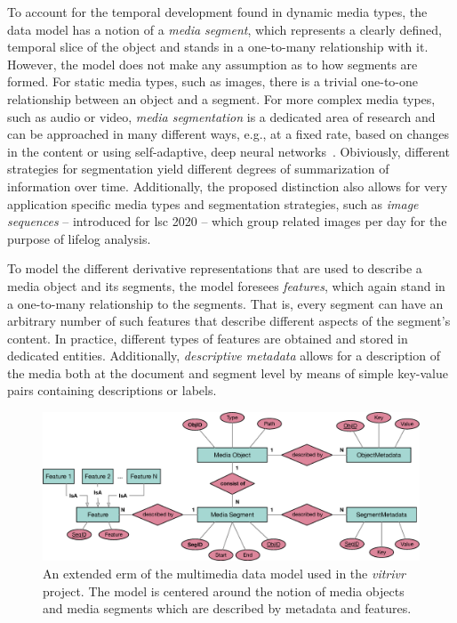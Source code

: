 To account for the temporal development found in dynamic media types, the data model has a notion of a \emph{media segment}, which represents a clearly defined, temporal slice of the object and stands in a one-to-many relationship with it. However, the model does not make any assumption as to how segments are formed. For static media types, such as images, there is a trivial one-to-one relationship between an object and a segment. For more complex media types, such as audio or video, \emph{media segmentation} is a dedicated area of research \cite{Koprinska:2001temporal} and can be approached in many different ways, e.g., at a fixed rate, based on changes in the content \cite{Foote:2000Automatic,Tsai:2016video} or using self-adaptive, deep neural networks~\cite{Souvcek:2019transnet}. Obiviously, different strategies for segmentation yield different degrees of summarization of information over time. Additionally, the proposed distinction also allows for very application specific media types and segmentation strategies, such as \emph{image sequences} -- introduced for \acrshort{lsc} 2020 \cite{Heller:2020Interactive} -- which group related images per day for the purpose of lifelog analysis.

To model the different derivative representations that are used to describe a media object and its segments, the model foresees \emph{features}, which again stand in a one-to-many relationship to the segments. That is, every segment can have an arbitrary number of such features that describe different aspects of the segment's content. In practice, different types of features are obtained and stored in dedicated entities. Additionally, \emph{descriptive metadata} allows for a description of the media both at the document and segment level by means of simple key-value pairs containing descriptions or labels.

\begin{figure}[bt]
    \centering
    \includegraphics[width=\textwidth]{figures/erm-media-data-vitrivr}
    \caption{An extended \acrshort{erm} of the multimedia data model used in the \emph{vitrivr} project. The model is centered around the notion of media objects and media segments which are described by metadata and features.}
    \label{figure:erm_mediadata_vitrivr}
\end{figure}

